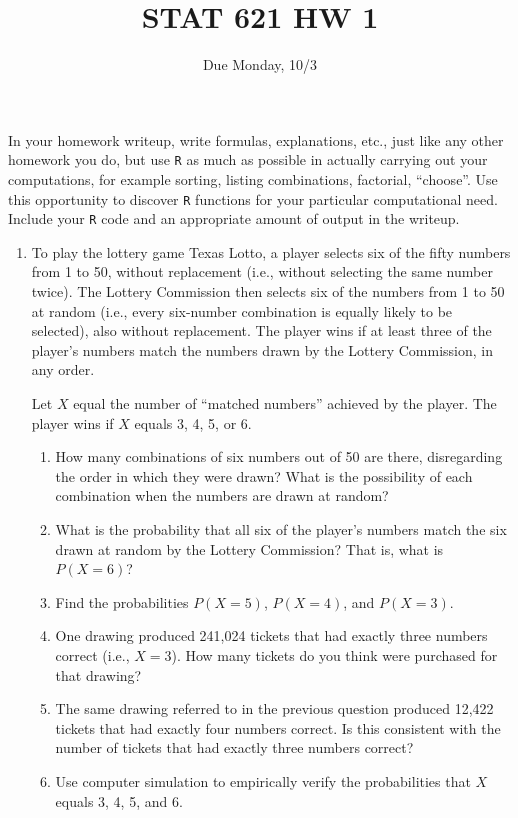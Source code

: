 \documentclass[12pt]{article}
\begin{document}
\title{STAT 621 HW 1}
\author{Due Monday, 10/3}
\maketitle

In your homework writeup,
write formulas, explanations, etc., just like any other homework you do,
but use \texttt{R} as much as possible in actually
carrying out your computations,
for example sorting, listing combinations, factorial, ``choose''.
Use this opportunity to discover \texttt{R} functions for your
particular computational need.
Include your \texttt{R} code and an appropriate amount of output
in the writeup.

\begin{enumerate}
\item
    To play the lottery game Texas Lotto,
    a player selects six of the fifty numbers from 1 to 50,
    without replacement (i.e., without selecting the same number twice).
    The Lottery Commission then selects six of the numbers from 1 to 50
    at random (i.e., every six-number combination is equally likely to
    be selected), also without replacement.
    The player wins if at least three of the player's numbers match
    the numbers drawn by the Lottery Commission, in any order.

    Let $X$ equal the number of ``matched numbers'' achieved by the
    player. The player wins if $X$ equals 3, 4, 5, or 6.

    \begin{enumerate}
    \item
        How many combinations of six numbers out of 50 are there,
        disregarding the order in which they were drawn?
        What is the possibility of each combination when the numbers are
        drawn at random?
    \item
        What is the probability that all six of the player's numbers
        match the six drawn at random by the Lottery Commission?
        That is, what is $P(X=6)$?
    \item
        Find the probabilities $P(X=5)$, $P(X=4)$, and $P(X=3)$.
    \item
        One drawing produced 241,024 tickets that had exactly three
        numbers correct (i.e., $X=3$).
        How many tickets do you think were purchased for that drawing?
    \item
        The same drawing referred to in the previous question produced
        12,422 tickets that had exactly four numbers correct.
        Is this consistent with the number of tickets that had exactly
        three numbers correct?
    \item
        Use computer simulation to empirically verify
        the probabilities that $X$ equals 3, 4, 5, and 6.
    \end{enumerate}


\end{enumerate}
\end{document}
